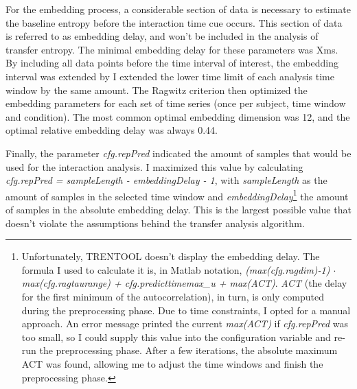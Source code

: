 For the embedding process, a considerable section of data is necessary to estimate the baseline entropy before the interaction time cue occurs.
This section of data is referred to as embedding delay, and won't be included in the analysis of transfer entropy.
The minimal embedding delay for these parameters was Xms.
By including all data points before the time interval of interest, the embedding interval was extended by 
I extended the lower time limit of each analysis time window by the same amount.
The Ragwitz criterion then optimized the embedding parameters for each set of time series (once per subject, time window and condition).
The most common optimal embedding dimension was 12, and the optimal relative embedding delay was always 0.44.

Finally, the parameter \emph{cfg.repPred} indicated the amount of samples that would be used for the interaction analysis.
I maximized this value by calculating \emph{cfg.repPred = sampleLength - embeddingDelay - 1}, with \emph{sampleLength} as the amount of samples in the selected time window and \emph{embeddingDelay}\footnote{Unfortunately, TRENTOOL doesn't display the embedding delay. The formula I used to calculate it is, in Matlab notation, \emph{(max(cfg.ragdim)-1) $\cdot$ max(cfg.ragtaurange) + cfg.predicttimemax\_u + max(ACT)}. \emph{ACT} (the delay for the first minimum of the autocorrelation), in turn, is only computed during the preprocessing phase. Due to time constraints, I opted for a manual approach. An error message printed the current \emph{max(ACT)} if \emph{cfg.repPred} was too small, so I could supply this value into the configuration variable and re-run the preprocessing phase. After a few iterations, the absolute maximum ACT was found, allowing me to adjust the time windows and finish the preprocessing phase.} the amount of samples in the absolute embedding delay.
This is the largest possible value that doesn't violate the assumptions behind the transfer analysis algorithm.


